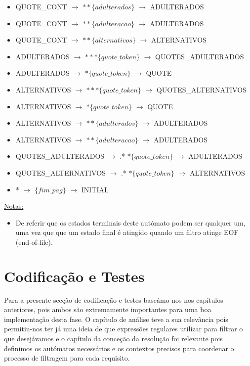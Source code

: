 \documentclass[11pt,a4paper]{report}
\begin{document}
\begin{itemize}
\begin{itemize}
			\item QUOTE\_CONT $\rightarrow$ $**\{adulterados\}$ $\rightarrow$ ADULTERADOS
			\item QUOTE\_CONT $\rightarrow$ $**\{adulteracao\}$ $\rightarrow$ ADULTERADOS
			\item QUOTE\_CONT $\rightarrow$ $**\{alternativos\}$ $\rightarrow$ ALTERNATIVOS
			\item ADULTERADOS $\rightarrow$ $***\{quote\_token\}$ $\rightarrow$ QUOTES\_ADULTERADOS
			\item ADULTERADOS $\rightarrow$ $*\{quote\_token\}$ $\rightarrow$ QUOTE
			\item ALTERNATIVOS $\rightarrow$ $***\{quote\_token\}$ $\rightarrow$ QUOTES\_ALTERNATIVOS
			\item ALTERNATIVOS $\rightarrow$ $*\{quote\_token\}$ $\rightarrow$ QUOTE
			\item ALTERNATIVOS $\rightarrow$ $**\{adulterados\}$ $\rightarrow$ ADULTERADOS
			\item ALTERNATIVOS $\rightarrow$ $**\{adulteracao\}$ $\rightarrow$ ADULTERADOS
			\item QUOTES\_ADULTERADOS $\rightarrow$ .* $*\{quote\_token\}$ $\rightarrow$ ADULTERADOS
			\item QUOTES\_ALTERNATIVOS $\rightarrow$ .* $*\{quote\_token\}$ $\rightarrow$ ALTERNATIVOS
			\item * $\rightarrow$ $\{fim\_pag\}$ $\rightarrow$ INITIAL
		\end{itemize}
\end{itemize}

\vspace{0.5cm}
	
\underline{Notas:}
\begin{itemize}
	\item De referir que os estados terminais deste autómato podem ser qualquer um, uma vez que que um estado final é atingido quando um filtro atinge EOF (end-of-file).
\end{itemize}

\chapter{Codificação e Testes}
\label{chap:codificacao}

Para a presente secção de codificação e testes baseámo-nos nos capítulos anteriores, pois ambos são extremamente importantes para uma boa implementação desta fase. O capítulo de análise teve a sua relevância pois permitiu-nos ter já uma ideia de que expressões regulares utilizar para filtrar o que desejávamos e o capítulo da conceção da resolução foi relevante pois definimos os autómatos necessários e os contextos precisos para coordenar o processo de filtragem para cada requisito.
\end{document}
